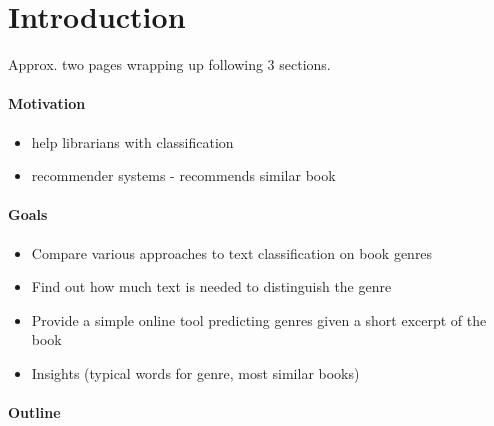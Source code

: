 \chapter{Introduction}

Approx. two pages wrapping up following 3 sections.

\subsubsection{Motivation}
\begin{itemize}
    \item help librarians with classification
    \item recommender systems - recommends similar book
\end{itemize}

\begin{comment}
Our algorithm can be used to label book texts which would benefit other researchers.
\end{comment}

\subsubsection{Goals}
\begin{itemize}
    \item Compare various approaches to text classification on book genres
    \item Find out how much text is needed to distinguish the genre
    \item Provide a simple online tool predicting genres given a short excerpt of the book
    \item Insights (typical words for genre, most similar books)
\end{itemize}

\subsubsection{Outline}
